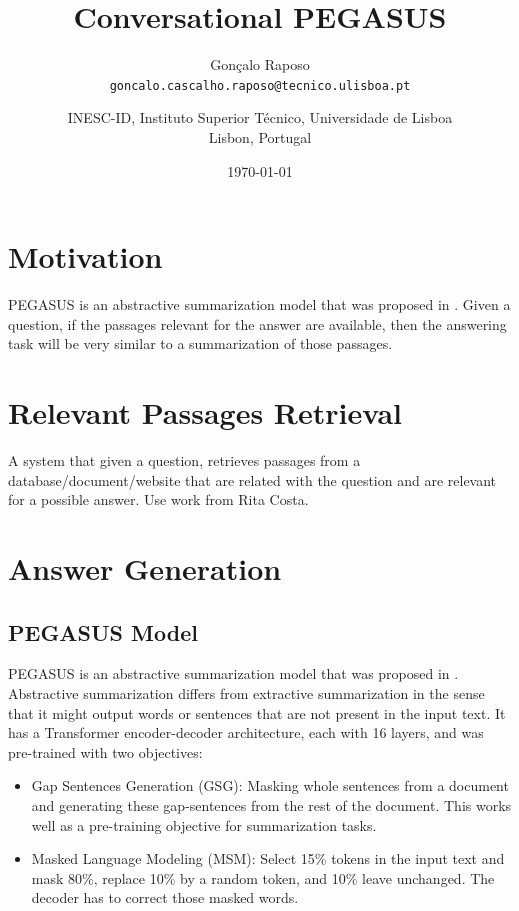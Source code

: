 \documentclass[a4paper, 10pt]{article}
\title{Conversational PEGASUS}
\date{\today}	%
\author{
	Gonçalo Raposo \\
	\texttt{goncalo.cascalho.raposo@tecnico.ulisboa.pt} \\
	\and
	INESC-ID, Instituto Superior Técnico, Universidade de Lisboa \\[2ex]
	Lisbon, Portugal
}
\begin{document}
\maketitle


\begin{abstract}

\end{abstract}



\section{Motivation}

    PEGASUS is an abstractive summarization model that was proposed in \cite{Zhang2020b}. Given a question, if the passages relevant for the answer are available, then the answering task will be very similar to a summarization of those passages.

\section{Relevant Passages Retrieval}

    A system that given a question, retrieves passages from a database/document/website that are related with the question and are relevant for a possible answer. Use work from Rita Costa.

\section{Answer Generation}
    \subsection{PEGASUS Model}
    
        PEGASUS is an abstractive summarization model that was proposed in \cite{Zhang2020b}. Abstractive summarization differs from extractive summarization in the sense that it might output words or sentences that are not present in the input text. It has a Transformer encoder-decoder architecture, each with 16 layers, and was pre-trained with two objectives:

        \begin{itemize}
            \item Gap Sentences Generation (GSG): Masking whole sentences from a document and generating these gap-sentences from the rest of the document. This works well as a pre-training objective for summarization tasks.
            \item Masked Language Modeling (MSM): Select 15\% tokens in the input text and mask 80\%, replace 10\% by a random token, and 10\% leave unchanged. The decoder has to correct those masked words.
        \end{itemize}
\end{document}
